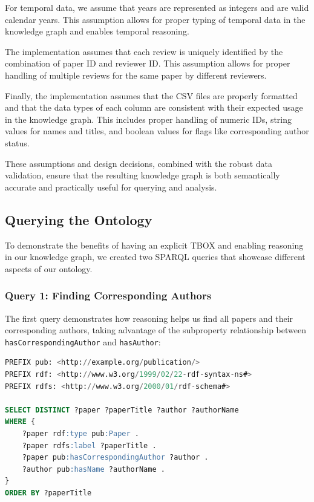 \documentclass[10pt,a4paper]{article}
\begin{document}
For temporal data, we assume that years are represented as integers and are valid calendar years. This assumption allows for proper typing of temporal data in the knowledge graph and enables temporal reasoning.

The implementation assumes that each review is uniquely identified by the combination of paper ID and reviewer ID. This assumption allows for proper handling of multiple reviews for the same paper by different reviewers.

Finally, the implementation assumes that the CSV files are properly formatted and that the data types of each column are consistent with their expected usage in the knowledge graph. This includes proper handling of numeric IDs, string values for names and titles, and boolean values for flags like corresponding author status.

These assumptions and design decisions, combined with the robust data validation, ensure that the resulting knowledge graph is both semantically accurate and practically useful for querying and analysis.

\subsection{Querying the Ontology}

To demonstrate the benefits of having an explicit TBOX and enabling reasoning in our knowledge graph, we created two SPARQL queries that showcase different aspects of our ontology.

\subsubsection{Query 1: Finding Corresponding Authors}

The first query demonstrates how reasoning helps us find all papers and their corresponding authors, taking advantage of the subproperty relationship between \texttt{hasCorrespondingAuthor} and \texttt{hasAuthor}:

\begin{lstlisting}[language=SQL]
PREFIX pub: <http://example.org/publication/>
PREFIX rdf: <http://www.w3.org/1999/02/22-rdf-syntax-ns#>
PREFIX rdfs: <http://www.w3.org/2000/01/rdf-schema#>

SELECT DISTINCT ?paper ?paperTitle ?author ?authorName
WHERE {
    ?paper rdf:type pub:Paper .
    ?paper rdfs:label ?paperTitle .
    ?paper pub:hasCorrespondingAuthor ?author .
    ?author pub:hasName ?authorName .
}
ORDER BY ?paperTitle
\end{lstlisting}
\end{document}
